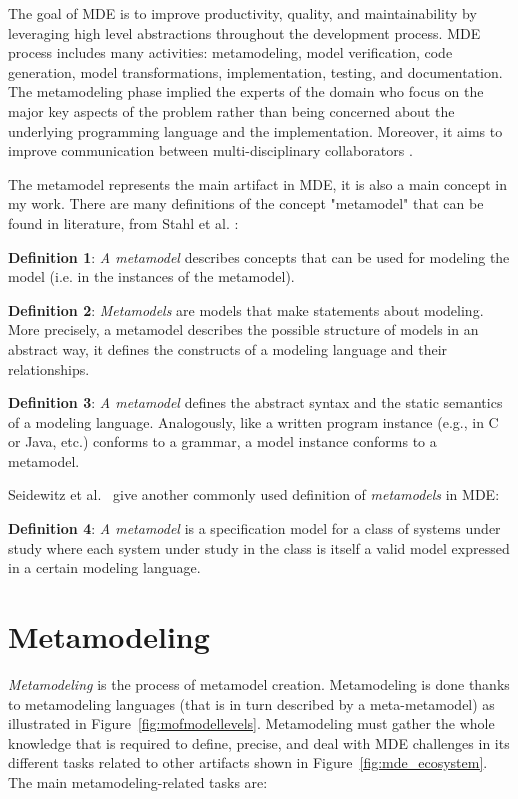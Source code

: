 
The goal of MDE is to improve productivity, quality, and maintainability by leveraging high level abstractions throughout the development process. MDE process includes many activities: metamodeling, model verification, code generation, model transformations, implementation, testing, and documentation. The metamodeling phase implied the experts of the domain who focus on the major key aspects of the problem rather than being concerned about the underlying programming language and the implementation. Moreover, it aims to improve communication between multi-disciplinary collaborators \cite{wortmann2020modeling}.

The metamodel represents the main artifact in MDE, it is also a main concept in my work. There are many definitions of the concept "metamodel" that can be found in literature, from Stahl et al. \cite{stahl2006model}:

\textbf{Definition 1}: \textit{A metamodel} describes concepts that can be used for modeling the model (i.e. in the instances of the metamodel).

\textbf{Definition 2}: \textit {Metamodels} are models that make statements about modeling. More precisely, a metamodel describes the possible structure of models in an abstract way, it defines the constructs of a modeling language and their relationships.

\textbf{Definition 3}: \textit{A metamodel} defines the abstract syntax and the static semantics of a modeling language. Analogously, like a written program instance (e.g., in C or Java, etc.) conforms to a grammar, a model instance conforms to a metamodel.

Seidewitz et al.~\cite{seidewitz2003models} give another commonly used definition of \textit{metamodels} in MDE:

\textbf{Definition 4}: \textit{A metamodel} is a specification model for a class of systems under study where each system under study in the class is itself a valid model expressed in a certain modeling language.

\section{Metamodeling}
\label{Metamodeling}
\textit{Metamodeling} is the process of metamodel creation. Metamodeling is done thanks to metamodeling languages (that is in turn described by a meta-metamodel) as illustrated in Figure~\ref{fig:mofmodellevels}. Metamodeling must gather the whole knowledge that is required to define, precise, and deal with MDE challenges in its different tasks \cite{wortmann2020modeling} related to other artifacts shown in Figure~\ref{fig:mde_ecosystem}. The main metamodeling-related tasks are:

